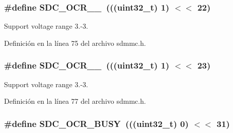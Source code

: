 \subsubsection[{\texorpdfstring{S\+D\+C\+\_\+\+O\+C\+R\+\_\+34\+\_\+35}{SDC_OCR_34_35}}]{\setlength{\rightskip}{0pt plus 5cm}\#define S\+D\+C\+\_\+\+O\+C\+R\+\_\+\_~(((uint32\+\_\+t) 1) $<$$<$ 22)}\hypertarget{group___c_h_i_p___s_d_m_m_c___definitions_ga0c33b5b93a1ac282472eb94658f45682}{}\label{group___c_h_i_p___s_d_m_m_c___definitions_ga0c33b5b93a1ac282472eb94658f45682}
Support voltage range 3.-\/3. 

Definición en la línea 75 del archivo sdmmc.\+h.

\subsubsection[{\texorpdfstring{S\+D\+C\+\_\+\+O\+C\+R\+\_\+35\+\_\+36}{SDC_OCR_35_36}}]{\setlength{\rightskip}{0pt plus 5cm}\#define S\+D\+C\+\_\+\+O\+C\+R\+\_\+\_~(((uint32\+\_\+t) 1) $<$$<$ 23)}\hypertarget{group___c_h_i_p___s_d_m_m_c___definitions_gaecffa97c6d53b409d41f8d81ab52eb59}{}\label{group___c_h_i_p___s_d_m_m_c___definitions_gaecffa97c6d53b409d41f8d81ab52eb59}
Support voltage range 3.-\/3. 

Definición en la línea 77 del archivo sdmmc.\+h.

\subsubsection[{\texorpdfstring{S\+D\+C\+\_\+\+O\+C\+R\+\_\+\+B\+U\+SY}{SDC_OCR_BUSY}}]{\setlength{\rightskip}{0pt plus 5cm}\#define S\+D\+C\+\_\+\+O\+C\+R\+\_\+\+B\+U\+SY~(((uint32\+\_\+t) 0) $<$$<$ 31)}\hypertarget{group___c_h_i_p___s_d_m_m_c___definitions_ga457a04e9259c7c26b56a96c87f628ae2}{}\label{group___c_h_i_p___s_d_m_m_c___definitions_ga457a04e9259c7c26b56a96c87f628ae2}


